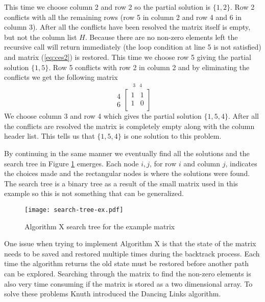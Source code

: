 This time we choose column 2 and row 2 so the partial solution is $\{ 1, 2 \}$.
Row 2 conflicts with all the remaining rows (row 5 in column 2 and row 4 and 6 in column 3).
After all the conflicts have been resolved the matrix itself is empty, but not the column list $H$.
Because there are no non-zero elements left the recursive call will return immediately (the loop condition at line 5 is not satisfied) and matrix (\ref{eq:ces2}) is restored.
This time we choose row 5 giving the partial solution $\{ 1, 5 \}$.
Row 5 conflicts with row 2 in column 2 and by eliminating the conflicts we get the following matrix
\begin{equation}
	\label{eq:ces3}
	\begin{array}{r} 4\\ 6 \end{array}
	\stackrel{
		\begin{array}{ccc} 3 & 4 \end{array}
	}{
		\begin{bmatrix}
			1 & 1 \\
			1 & 0 \\
		\end{bmatrix}
	}
\end{equation}
We choose column 3 and row 4 which gives the partial solution $\{ 1, 5, 4 \}$.
After all the conflicts are resolved the matrix is completely empty along with the column header list.
This tells us that $\{ 1, 5, 4 \}$ is one solution to this problem.

By continuing in the same manner we eventually find all the solutions and the search tree in Figure \ref{fig:ex_tree} emerges.
Each node $i,j$, for row $i$ and column $j$, indicates the choices made and the rectangular nodes is where the solutions were found.
The search tree is a binary tree as a result of the small matrix used in this example so this is not something that can be generalized.
\begin{figure}[H]
	\centering 
	\texttt{[image: search-tree-ex.pdf]}
	\caption{Algorithm X search tree for the example matrix}
	\label{fig:ex_tree}
\end{figure}

One issue when trying to implement Algorithm X is that the state of the matrix needs to be saved and restored multiple times during the backtrack process.
Each time the algorithm returns the old state must be restored before another path can be explored.
Searching through the matrix to find the non-zero elements is also very time consuming if the matrix is stored as a two dimensional array.
To solve these problems Knuth introduced the Dancing Links algorithm.



